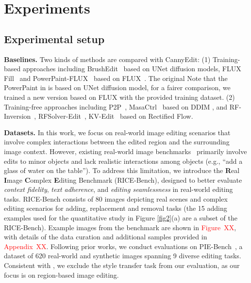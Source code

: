 \documentclass{article}
\begin{document}
\section{Experiments}
\label{Sec:experiment}


\subsection{Experimental setup}

\textbf{Baselines.} Two kinds of methods are compared with CannyEdit: (1) Training-based approaches including BrushEdit~\cite{li2024brushedit} based on UNet diffusion models, FLUX Fill~\cite{blackforest2024FLUX} and PowerPaint-FLUX~\cite{zhuang2023task} based on FLUX~\cite{blackforest2024FLUX}. The original Note that the PowerPaint in \cite{blackforest2024FLUX} is based on UNet diffusion model, for a fairer comparison, we trained a new version based on FLUX with the provided training dataset. (2) Training-free approaches including P2P~\cite{hertz2022prompt}, MasaCtrl~\cite{cao2023masactrl} based on DDIM \citep{song2022denoisingdiffusionimplicitmodels}, and RF-Inversion~\cite{rout2024semantic}, RFSolver-Edit~\cite{wang2024taming}, KV-Edit~\cite{zhu2025kv} based on Rectified
Flow. %

\textbf{Datasets.} In this work, we focus on real-world image editing scenarios that involve complex interactions between the edited region and the surrounding image context. However, existing real-world image benchmarks~\citep{sheynin2024emu,gu2024multi} primarily involve edits to minor objects and lack realistic interactions among objects (e.g., ``add a glass of water on the table''). To address this limitation, we introduce the \textbf{R}eal \textbf{I}mage \textbf{C}omplex \textbf{E}diting Benchmark ({RICE-Bench}), designed to better evaluate \textit{context fidelity}, \textit{text adherence}, and \textit{editing seamlessness} in real-world editing tasks. RICE-Bench consists of 80 images depicting real scenes and complex editing scenarios for adding, replacement and removal tasks (the 15 adding examples used for the quantitative study in Figure \ref{fig2}(a) are a subset of the RICE-Bench). Example images from the benchmark are shown in \textcolor{red}{Figure~XX}, with details of the data curation and additional samples provided in \textcolor{red}{Appendix~XX}. Following prior works, we conduct evaluations on PIE-Bench~\cite{ju2024pnp}, a dataset of 620 real-world and synthetic images spanning 9 diverse editing tasks. Consistent with \cite{li2024brushedit, xu2023infedit, zhu2025kv}, we exclude the style transfer task from our evaluation, as our focus is on region-based image editing.
\end{document}
